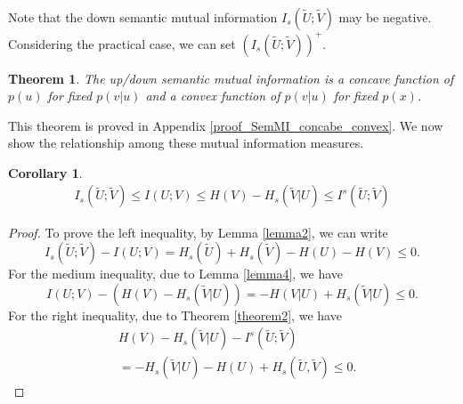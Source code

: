 \documentclass[12pt, draftclsnofoot,onecolumn]{IEEEtran}
\newtheorem{theorem}{\bf{Theorem}}
\newtheorem{corollary}{\bf{Corollary}}
\begin{document}
Note that the down semantic mutual information $I_s (\tilde{U};\tilde{V} )$ may be negative. Considering the practical case, we can set $(I_s (\tilde{U};\tilde{V} ))^{+}$.
\begin{theorem}\label{SemMI_concave_convex}
The up/down semantic mutual information is a concave function of $p(u)$ for fixed $p(v|u)$ and a convex function of $p(v|u)$ for fixed $p(x)$.
\end{theorem}

This theorem is proved in Appendix \ref{proof_SemMI_concabe_convex}. We now show the relationship among these mutual information measures.
\begin{corollary}\label{corollary3}
\begin{equation}
\begin{aligned}
I_s (\tilde{U};\tilde{V}) \leq I (U;V )\leq H (V )-H_s (\tilde{V}\left|U\right. ) \leq I^s (\tilde{U};\tilde{V} )
\end{aligned}
\end{equation}
\end{corollary}
\begin{proof}
To prove the left inequality, by Lemma \ref{lemma2}, we can write
\begin{equation}
I_s (\tilde{U};\tilde{V} )-I (U;V )=H_s(\tilde{U})+H_s(\tilde{V})-H(U)-H(V)\leq 0.
\end{equation}
For the medium inequality, due to Lemma \ref{lemma4}, we have
\begin{equation}
I (U;V )-  (H (V )-H_s (\tilde{V}\left|U\right. ) )=-H (V|U )+H_s (\tilde{V}\left|U\right. )\leq 0.
\end{equation}
For the right inequality, due to Theorem \ref{theorem2}, we have
\begin{equation}
\begin{aligned}
 &H (V )-H_s (\tilde{V}\left|U\right. )- I^s (\tilde{U};\tilde{V} )\\
 &= -H_s (\tilde{V}\left|U\right. )-H(U)+H_s(\tilde{U},\tilde{V})\leq 0.
\end{aligned}
\end{equation}
\end{proof}
\end{document}
